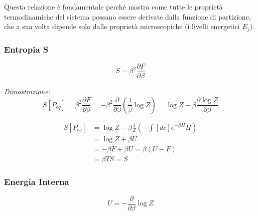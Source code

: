 Questa relazione è fondamentale perché mostra come tutte le proprietà termodinamiche del sistema possano essere derivate dalla funzione di partizione, che a sua volta dipende solo dalle proprietà microscopiche (i livelli energetici $E_j$).

\vspace{1cm}

\subsubsection{Entropia S}
\begin{tcolorbox}[colback=yellow!30,  
                  colframe=yellow!50!orange,  
                  boxrule=0.8pt, 
                  arc=3pt,  
                  top=4pt, bottom=4pt, left=6pt, right=6pt,
                  enhanced,
                  sharp corners=south]
\begin{equation}
S = \beta^2 \frac{\partial F}{\partial \beta}
\end{equation}
\end{tcolorbox}


\textit{Dimostrazione:} 
\begin{equation}
    S[P_{eq}] = \beta^2 \frac{\partial F}{\partial \beta} = -\beta^2 \frac{\partial}{\partial \beta} (\frac{1}{\beta} \log Z) = \log Z - \beta \frac{\partial \log Z}{\partial \beta}
\end{equation}



\begin{equation}
\begin{split}
    S[P_{eq}] &= \log Z - \beta \frac{1}{Z} (-\int [dc] e^{-\beta H} H)
  \\ &= \log Z + \beta U \\ &= -\beta F + \beta U = \beta (U-F)  \\ &= \beta T S = S
\end{split}
\end{equation}

\vspace{1cm}
\subsubsection{Energia Interna}
\begin{tcolorbox}[colback=yellow!30,  
                  colframe=yellow!50!orange,  
                  boxrule=0.8pt, 
                  arc=3pt,  
                  top=4pt, bottom=4pt, left=6pt, right=6pt,
                  enhanced,
                  sharp corners=south]
\begin{equation}
U = -\frac{\partial}{\partial \beta} \log Z
\end{equation}
\end{tcolorbox}


